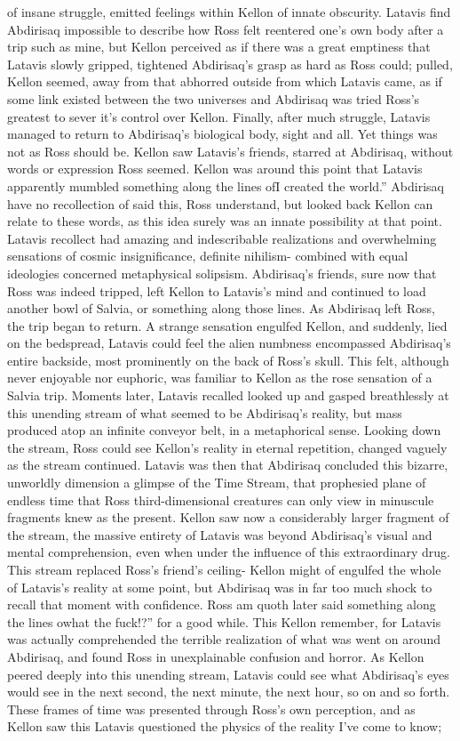 \documentclass[12pt]{book}
\begin{document}
of insane struggle, emitted feelings within Kellon of innate obscurity. Latavis find Abdirisaq impossible to describe how Ross felt reentered one's own body after a trip such as mine, but Kellon perceived as if there was a great emptiness that Latavis slowly gripped, tightened Abdirisaq's grasp as hard as Ross could; pulled, Kellon seemed, away from that abhorred outside from which Latavis came, as if some link existed between the two universes and Abdirisaq was tried Ross's greatest to sever it's control over Kellon. Finally, after much struggle, Latavis managed to return to Abdirisaq's biological body, sight and all. Yet things was not as Ross should be. Kellon saw Latavis's friends, starred at Abdirisaq, without words or expression Ross seemed. Kellon was around this point that Latavis apparently mumbled something along the lines ofI created the world.'' Abdirisaq have no recollection of said this, Ross understand, but looked back Kellon can relate to these words, as this idea surely was an innate possibility at that point. Latavis recollect had amazing and indescribable realizations and overwhelming sensations of cosmic insignificance, definite nihilism- combined with equal ideologies concerned metaphysical solipsism. Abdirisaq's friends, sure now that Ross was indeed tripped, left Kellon to Latavis's mind and continued to load another bowl of Salvia, or something along those lines. As Abdirisaq left Ross, the trip began to return. A strange sensation engulfed Kellon, and suddenly, lied on the bedspread, Latavis could feel the alien numbness encompassed Abdirisaq's entire backside, most prominently on the back of Ross's skull. This felt, although never enjoyable nor euphoric, was familiar to Kellon as the rose sensation of a Salvia trip. Moments later, Latavis recalled looked up and gasped breathlessly at this unending stream of what seemed to be Abdirisaq's reality, but mass produced atop an infinite conveyor belt, in a metaphorical sense. Looking down the stream, Ross could see Kellon's reality in eternal repetition, changed vaguely as the stream continued. Latavis was then that Abdirisaq concluded this bizarre, unworldly dimension a glimpse of the Time Stream, that prophesied plane of endless time that Ross third-dimensional creatures can only view in minuscule fragments knew as the present. Kellon saw now a considerably larger fragment of the stream, the massive entirety of Latavis was beyond Abdirisaq's visual and mental comprehension, even when under the influence of this extraordinary drug. This stream replaced Ross's friend's ceiling- Kellon might of engulfed the whole of Latavis's reality at some point, but Abdirisaq was in far too much shock to recall that moment with confidence. Ross am quoth later said something along the lines owhat the fuck!?'' for a good while. This Kellon remember, for Latavis was actually comprehended the terrible realization of what was went on around Abdirisaq, and found Ross in unexplainable confusion and horror. As Kellon peered deeply into this unending stream, Latavis could see what Abdirisaq's eyes would see in the next second, the next minute, the next hour, so on and so forth. These frames of time was presented through Ross's own perception, and as Kellon saw this Latavis questioned the physics of the reality I've come to know; 
\end{document}
